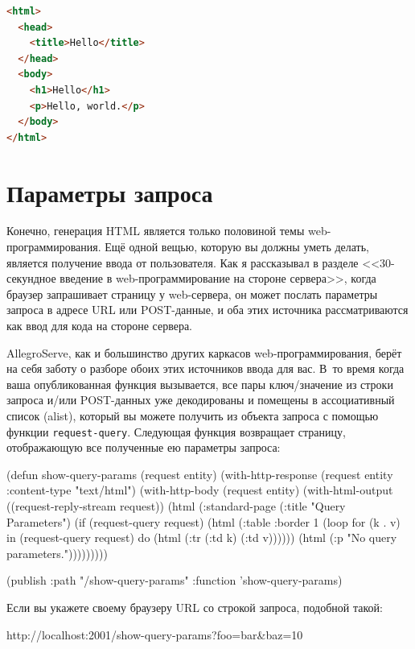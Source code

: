 \begin{lstlisting}[language=HTML]
<html>
  <head>
    <title>Hello</title>
  </head>
  <body>
    <h1>Hello</h1>
    <p>Hello, world.</p>
  </body>
</html>
\end{lstlisting}

\section{Параметры запроса}

Конечно, генерация HTML является только половиной темы web-программирования. Ещё одной
вещью, которую вы должны уметь делать, является получение ввода от пользователя. Как я
рассказывал в разделе <<30-секундное введение в web-программирование на стороне сервера>>,
когда браузер запрашивает страницу у web-сервера, он может послать параметры запроса в
адресе URL или POST-данные, и оба этих источника рассматриваются как ввод для кода на
стороне сервера.

AllegroServe, как и большинство других каркасов web-программирования, берёт на себя заботу
о разборе обоих этих источников ввода для вас. В~то время когда ваша опубликованная
функция вызывается, все пары ключ/значение из строки запроса и/или POST-данных уже
декодированы и помещены в ассоциативный список (alist), который вы можете получить из
объекта запроса с помощью функции \lstinline{request-query}. Следующая функция возвращает
страницу, отображающую все полученные ею параметры запроса:

\begin{myverb}
(defun show-query-params (request entity)
  (with-http-response (request entity :content-type "text/html")
    (with-http-body (request entity)
      (with-html-output ((request-reply-stream request))
        (html
          (:standard-page
           (:title "Query Parameters")
           (if (request-query request)
             (html 
               (:table :border 1
                       (loop for (k . v) in (request-query request)
                          do (html (:tr (:td k) (:td v))))))
             (html (:p "No query parameters.")))))))))

(publish :path "/show-query-params" :function 'show-query-params)
\end{myverb}

Если вы укажете своему браузеру URL со строкой запроса, подобной такой:

\begin{myverb}
http://localhost:2001/show-query-params?foo=bar&baz=10
\end{myverb}

